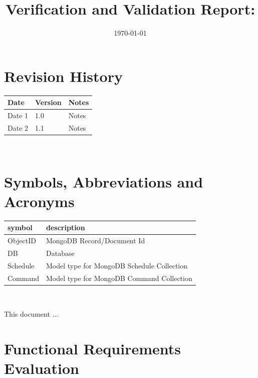 \documentclass[12pt, titlepage]{article}
\begin{document}
\title{Verification and Validation Report: \progname} 
\author{\authname}
\date{\today}
	
\maketitle


\section{Revision History}

\begin{tabularx}{\textwidth}{p{3cm}p{2cm}X}
\toprule {\bf Date} & {\bf Version} & {\bf Notes}\\
\midrule
Date 1 & 1.0 & Notes\\
Date 2 & 1.1 & Notes\\
\bottomrule
\end{tabularx}

~\newpage

\section{Symbols, Abbreviations and Acronyms}

\renewcommand{\arraystretch}{1.2}
\begin{tabular}{l l} 
  \toprule		
  \textbf{symbol} & \textbf{description}\\
  \midrule 
  ObjectID & MongoDB Record/Document Id\\
  DB & Database\\
  Schedule & Model type for MongoDB Schedule Collection \\
  Command & Model type for MongoDB Command Collection \\
  \bottomrule
\end{tabular}\\


\newpage

\tableofcontents

\listoftables %

\listoffigures %

\newpage


This document ...

\section{Functional Requirements Evaluation}
\end{document}

